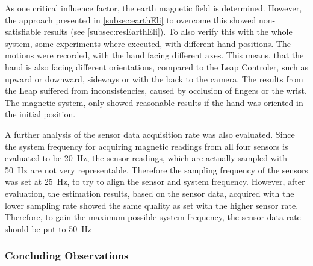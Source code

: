As one critical influence factor, the earth magnetic field is determined. However, the approach presented in \ref{subsec:earthEli} to overcome this showed non-satisfiable results (see \ref{subsec:resEarthEli}). To also verify this with the whole system, some experiments where executed, with different hand positions. The motions were recorded, with the hand facing different axes. This means, that the hand is also facing different orientations, compared to the Leap Controler, such as upward or downward, sideways or with the back to the camera. The results from the Leap suffered from inconsistencies, caused by occlusion of fingers or the wrist. The magnetic system, only showed reasonable results if the hand was oriented in the initial position.

A further analysis of the sensor data acquisition rate was also evaluated. Since the system frequency for acquiring magnetic readings from all four sensors is evaluated to be \SI{20}{\Hz}, the sensor readings, which are actually sampled with \SI{50}{\Hz} are not very representable. Therefore the sampling frequency of the sensors was set at \SI{25}{\Hz}, to try to align the sensor and system frequency. However, after evaluation, the estimation results, based on the sensor data, acquired with the lower sampling rate showed the same quality as set with the higher sensor rate. Therefore, to gain the maximum possible system frequency, the sensor data rate should be put to \SI{50}{\Hz}

\FloatBarrier
\subsubsection{Concluding Observations}

